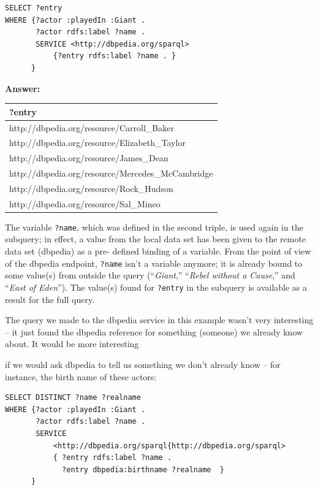 \begin{lstlisting}
SELECT ?entry
WHERE {?actor :playedIn :Giant .
       ?actor rdfs:label ?name . 
       SERVICE <http://dbpedia.org/sparql>
           {?entry rdfs:label ?name . }
      }
\end{lstlisting}


\textbf{\textbf{Answer:}}

\begin{tabular}{|l|}
\hline
?entry\\
\hline
http://dbpedia.org/resource/Carroll\_Baker\\
http://dbpedia.org/resource/Elizabeth\_Taylor\\
http://dbpedia.org/resource/James\_Dean\\
http://dbpedia.org/resource/Mercedes\_McCambridge\\
http://dbpedia.org/resource/Rock\_Hudson\\
http://dbpedia.org/resource/Sal\_Mineo\\
\hline
\end{tabular}

The variable \texttt{?name}, which was defined in the second triple, is used
again in the subquery; in effect, a value from the local data set has
been given to the remote data set (dbpedia) as a pre- defined binding of
a variable. From the point of view of the dbpedia endpoint, \texttt{?name} isn't
a variable anymore; it is already bound to some value(s) from outside
the query (``\emph{Giant},'' ``\emph{Rebel without a Cause},'' and
``\emph{East of Eden}''). The value(s) found for \texttt{?entry} in the subquery
is available as a result for the full query.

The query we made to the dbpedia service in this example wasn't very
interesting -- it just found the dbpedia reference for something
(someone) we already know about. It would be more interesting

if we would ask dbpedia to tell us something we don't already know --
for instance, the birth name of these actors:


\begin{lstlisting}
SELECT DISTINCT ?name ?realname
WHERE {?actor :playedIn :Giant .
       ?actor rdfs:label ?name .
       SERVICE
           <http://dbpedia.org/sparql{http://dbpedia.org/sparql>
           { ?entry rdfs:label ?name .
             ?entry dbpedia:birthname ?realname  }
      }
\end{lstlisting}



